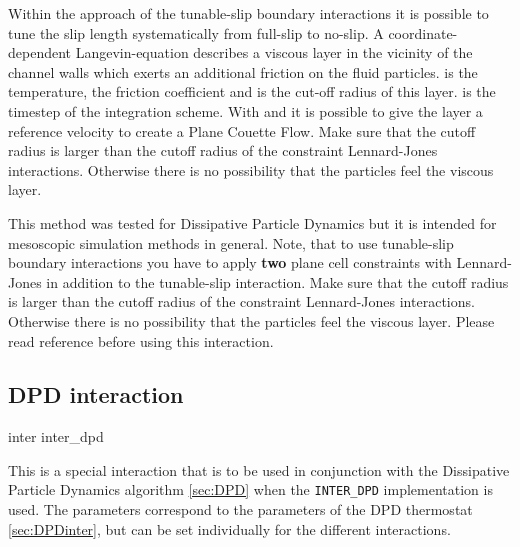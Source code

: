 Within the approach of the tunable-slip boundary interactions it is
possible to tune the slip length systematically from full-slip to
no-slip.  A coordinate-dependent Langevin-equation describes a viscous
layer in the vicinity of the channel walls which exerts an additional
friction on the fluid particles.   is the temperature,
 the friction coefficient and  is
the cut-off radius of this layer.  is the timestep of
the integration scheme. With   and  it is
possible to give the layer a reference velocity to create a Plane
Couette Flow.  Make sure that the cutoff radius 
is larger than the cutoff radius of the constraint Lennard-Jones
interactions. Otherwise there is no possibility that the particles
feel the viscous layer.

This method was tested for Dissipative Particle Dynamics but it is
intended for mesoscopic simulation methods in general. Note, that to
use tunable-slip boundary interactions you have to apply \textbf{two}
plane cell constraints with Lennard-Jones in addition to the
tunable-slip interaction. Make sure that the cutoff radius
 is larger than the cutoff radius of the
constraint Lennard-Jones interactions. Otherwise there is no
possibility that the particles feel the viscous layer.  Please read
reference \cite{smiatek08a} before using this interaction.

\subsection{DPD interaction}\label{sec:DPDinter}

\begin{essyntax}
  inter   inter_dpd       
  \begin{features}
  \end{features}
\end{essyntax}

This is a special interaction that is to be used in conjunction with
the Dissipative Particle Dynamics algorithm \ref{sec:DPD} when the
\texttt{INTER_DPD} implementation is used. The parameters correspond
to the parameters of the DPD thermostat \vref{sec:DPDinter}, but
can be set individually for the different interactions.

